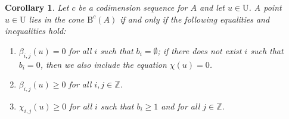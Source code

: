 \documentclass[12pt]{amsart}
\newtheorem{cor}[lemma]{Corollary}
\theoremstyle{definition}
\theoremstyle{remark}
\newcommand{\ZZ}{\mathbb{Z}}
\newcommand{\UU}{\mathrm{U}}
\newcommand{\bb}{c}
\newcommand{\nothing}{\emptyset}
\newcommand{\BBQ}{\mathrm{B}}
\begin{document}
\begin{cor}\label{cor:dualconeA refined}
Let $\bb$ be a codimension sequence for $A$ and let $u\in \UU$.
A point $u\in \UU$ lies in the cone $\BBQ^{\bb}(A)$ if and only if the following equalities and inequalities hold:
\begin{enumerate}
	\item $\beta_{i,j}(u)=0$ for all $i$ such that $b_i=\nothing$; if there does not exist $i$ such that $b_i=0$, then we also include the equation $\chi(u)=0$.
	\item $\beta_{i,j}(u)\geq 0$ for all $i,j\in \ZZ$.
	\item  $\chi_{i,j}(u)\geq 0$ for all $i$ such that $b_i\geq 1$ and for all $j\in \ZZ$.
\end{enumerate}
\end{cor}
\end{document}
